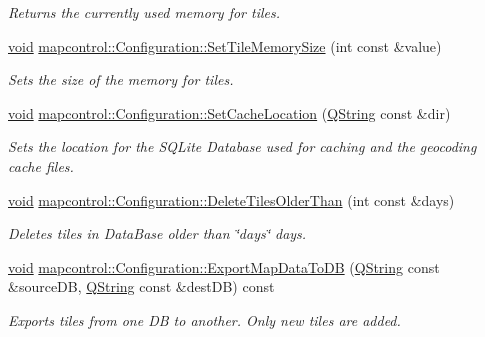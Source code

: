 \begin{DoxyCompactItemize}
\begin{DoxyCompactList}\small\item\em \-Returns the currently used memory for tiles. \end{DoxyCompactList}\item 
\hyperlink{group___u_a_v_objects_plugin_ga444cf2ff3f0ecbe028adce838d373f5c}{void} \hyperlink{group___o_p_map_widget_gaa6bfe2092080fa7a3464cece122819b5}{mapcontrol\-::\-Configuration\-::\-Set\-Tile\-Memory\-Size} (int const \&value)
\begin{DoxyCompactList}\small\item\em \-Sets the size of the memory for tiles. \end{DoxyCompactList}\item 
\hyperlink{group___u_a_v_objects_plugin_ga444cf2ff3f0ecbe028adce838d373f5c}{void} \hyperlink{group___o_p_map_widget_ga735443d74919b6c74f91fbf1f0576931}{mapcontrol\-::\-Configuration\-::\-Set\-Cache\-Location} (\hyperlink{group___u_a_v_objects_plugin_gab9d252f49c333c94a72f97ce3105a32d}{\-Q\-String} const \&dir)
\begin{DoxyCompactList}\small\item\em \-Sets the location for the \-S\-Q\-Lite \-Database used for caching and the geocoding cache files. \end{DoxyCompactList}\item 
\hyperlink{group___u_a_v_objects_plugin_ga444cf2ff3f0ecbe028adce838d373f5c}{void} \hyperlink{group___o_p_map_widget_ga66137fefcd998b31354b7c0c4575b40a}{mapcontrol\-::\-Configuration\-::\-Delete\-Tiles\-Older\-Than} (int const \&days)
\begin{DoxyCompactList}\small\item\em \-Deletes tiles in \-Data\-Base older than \char`\"{}days\char`\"{} days. \end{DoxyCompactList}\item 
\hyperlink{group___u_a_v_objects_plugin_ga444cf2ff3f0ecbe028adce838d373f5c}{void} \hyperlink{group___o_p_map_widget_ga373e3935f7b6ce79ca89a7bbfdff8a00}{mapcontrol\-::\-Configuration\-::\-Export\-Map\-Data\-To\-D\-B} (\hyperlink{group___u_a_v_objects_plugin_gab9d252f49c333c94a72f97ce3105a32d}{\-Q\-String} const \&source\-D\-B, \hyperlink{group___u_a_v_objects_plugin_gab9d252f49c333c94a72f97ce3105a32d}{\-Q\-String} const \&dest\-D\-B) const 
\begin{DoxyCompactList}\small\item\em \-Exports tiles from one \-D\-B to another. \-Only new tiles are added. \end{DoxyCompactList}\item 

\end{DoxyCompactItemize}
